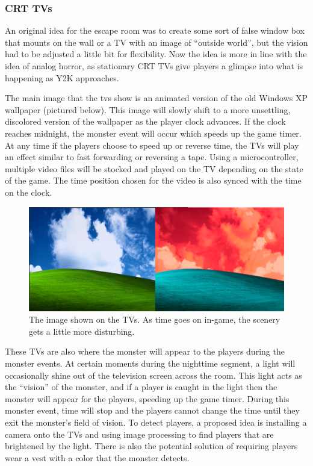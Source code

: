 \documentclass[conference]{IEEEtran}
\begin{document}
\subsubsection*{CRT TVs}
An original idea for the escape room was to create some sort of false window box that mounts on
the wall or a TV with an image of ``outside world'', but the vision had to be adjusted a little bit for flexibility.
Now the idea is more in line with the idea of analog horror, as stationary CRT TVs
give players a glimpse into what is happening as Y2K approaches.

The main image that the tvs show is an animated version of the old Windows XP wallpaper (pictured below).
This image will slowly shift to a more unsettling, discolored version of the wallpaper as the player clock advances. If the
clock reaches midnight, the monster event will occur which speeds up the game timer. At any time if the players
choose to speed up or reverse time, the TVs will play an effect similar to fast forwarding or reversing a tape.
Using a microcontroller, multiple video files will be stocked and played on the TV depending on the state of the
game. The time position chosen for the video is also synced with the time on the clock.

\begin{figure}[ht]
    \centering
    \includegraphics[width=0.90\columnwidth]{Images/tvcomparison.png}
    \caption{The image shown on the TVs. As time goes on in-game, the scenery
    gets a little more disturbing.}
\end{figure}

These TVs are also where the monster will appear to the players during the monster events. At certain moments
during the nighttime segment, a light will occasionally shine out of the television screen across the room. This light acts as
the ``vision'' of the monster, and if a player is caught in the light then the monster will appear for the players,
speeding up the game timer. During this monster event, time will stop and the players cannot change the
time until they exit the monster's field of vision. To detect players, a proposed idea is installing a camera
onto the TVs and using image processing to find players that are brightened by the light. There is also
the potential solution of requiring players wear a vest with a color that the monster detects.
\end{document}
